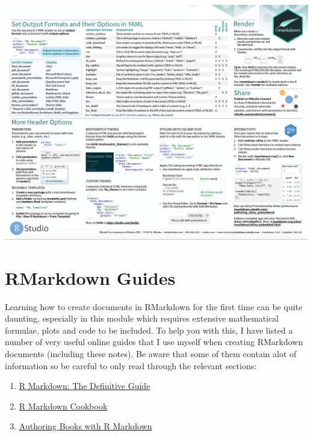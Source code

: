 \documentclass[
]{book}
\theoremstyle{definition}
\theoremstyle{definition}
\theoremstyle{definition}
\theoremstyle{definition}
\theoremstyle{remark}
\begin{document}
\begin{center}\includegraphics{Figures/RmarkdownCheatSheet2} \end{center}

\hypertarget{rmarkdown-guides}{%
\section*{RMarkdown Guides}\label{rmarkdown-guides}}

Learning how to create documents in RMarkdown for the first time can be quite daunting, especially in this module which requires extensive mathematical formulae, plots and code to be included. To help you with this, I have listed a number of very useful online guides that I use myself when creating RMarkdown documents (including these notes). Be aware that some of them contain alot of information so be careful to only read through the relevant sections:

\begin{enumerate}
\def\labelenumi{\arabic{enumi}.}
\item
  \href{https://bookdown.org/yihui/rmarkdown/}{R Markdown: The Definitive Guide}
\item
  \href{https://bookdown.org/yihui/rmarkdown-cookbook/}{R Markdown Cookbook}
\item
  \href{https://bookdown.org/yihui/bookdown/}{Authoring Books with R Markdown}
\end{enumerate}
\end{document}

